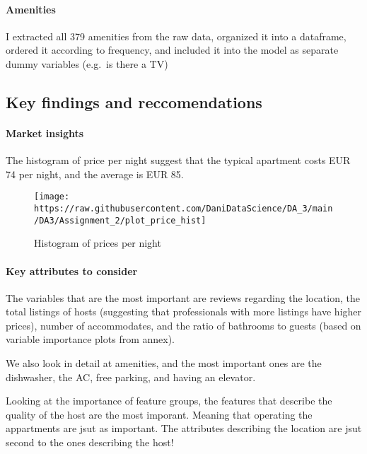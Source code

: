 \documentclass[
]{article}
\begin{document}
\hypertarget{amenities}{%
\paragraph{Amenities}\label{amenities}}

I extracted all 379 amenities from the raw data, organized it into a
dataframe, ordered it according to frequency, and included it into the
model as separate dummy variables (e.g.~is there a TV)

\hypertarget{key-findings-and-reccomendations}{%
\subsection{Key findings and
reccomendations}\label{key-findings-and-reccomendations}}

\hypertarget{market-insights}{%
\paragraph{Market insights}\label{market-insights}}

The histogram of price per night suggest that the typical apartment
costs EUR 74 per night, and the average is EUR 85.

\begin{figure}

{\centering \texttt{[image: https://raw.githubusercontent.com/DaniDataScience/DA\_3/main/DA3/Assignment\_2/plot\_price\_hist]} 

}

\caption{Histogram of prices per night}\label{fig:unnamed-chunk-2}
\end{figure}

\hypertarget{key-attributes-to-consider}{%
\paragraph{Key attributes to
consider}\label{key-attributes-to-consider}}

The variables that are the most important are reviews regarding the
location, the total listings of hosts (suggesting that professionals
with more listings have higher prices), number of accommodates, and the
ratio of bathrooms to guests (based on variable importance plots from
annex).

We also look in detail at amenities, and the most important ones are the
dishwasher, the AC, free parking, and having an elevator.

Looking at the importance of feature groups, the features that describe
the quality of the host are the most imporant. Meaning that operating
the appartments are jsut as important. The attributes describing the
location are jsut second to the ones describing the host!
\end{document}
